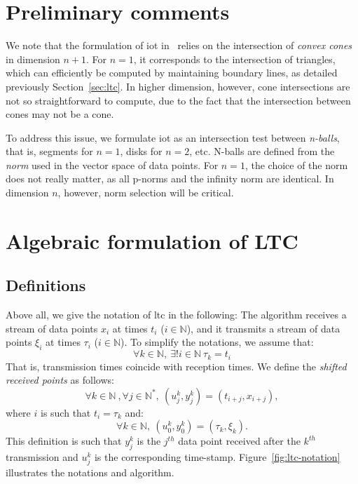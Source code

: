 \section{Preliminary comments}

We note that the formulation of \acrshort{iot}
in~\cite{schoellhammer2004lightweight} relies on the intersection of
\emph{convex cones} in dimension $n+1$. For $n=1$, it corresponds to the
intersection of triangles, which can efficiently be computed by maintaining
boundary lines, as detailed previously Section~\ref{sec:ltc}. In higher
dimension, however, cone intersections are not so straightforward to compute,
due to the fact that the intersection between cones may not be a cone.

To address this issue, we formulate \acrshort{iot} as an intersection test
between \emph{n-balls}, that is, segments for $n=1$, disks for $n=2$, etc.
N-balls are defined from the \emph{norm} used in the vector space of data
points. For $n=1$, the choice of the norm does not really matter, as all p-norms
and the infinity norm are identical. In dimension $n$, however, norm selection
will be critical.

\section{Algebraic formulation of LTC}

\subsection{Definitions}

Above all, we give the notation of \acrshort{ltc} in the
following: The algorithm receives a stream of data points $x_i$ at times $t_i$
($i \in \mathbb{N}$), and it transmits a stream of data points $\xi_i$ at times
$\tau_i$ ($i \in \mathbb{N}$). To simplify the notations, we assume that:
\begin{equation}
\forall k \in \mathbb{N}, \  \exists ! i \in \mathbb{N} \  \tau_k = t_i
\end{equation}
That is, transmission times coincide with reception times.
We define the \emph{shifted received points} as follows:
\begin{equation}
\label{eq:ltc-2}
\forall k \in \mathbb{N}\ , \forall j \in \mathbb{N^*},\ (u^k_j, y^k_j) = (t_{i+j}, x_{i+j}), 
\end{equation}
where $i$ is such that $t_i = \tau_k$ and:
\begin{equation}
\label{eq:ltc-3}
\forall k \in \mathbb{N},\  (u^k_0, y^k_0) = (\tau_k, \xi_k).
\end{equation}
This definition is such that $y^k_j$ is the $j^{th}$ data point received
after the $k^{th}$ transmission and $u^k_j$ is the corresponding time-stamp.
Figure~\ref{fig:ltc-notation} illustrates the notations and algorithm.

